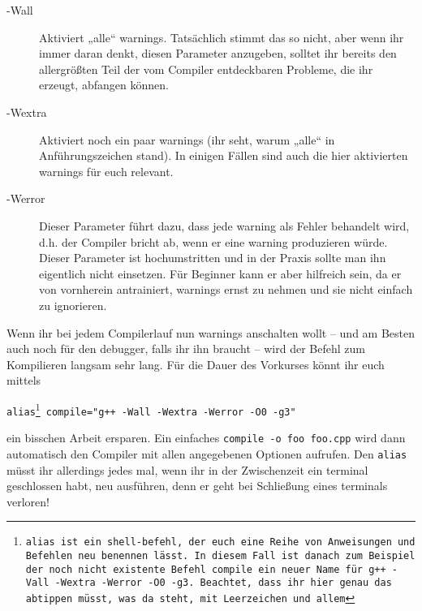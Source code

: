 \begin{description}
    \item[-Wall]
          Aktiviert „alle“ warnings. Tatsächlich stimmt das so nicht, aber wenn
          ihr immer daran denkt, diesen Parameter anzugeben, solltet ihr bereits
          den allergrößten Teil der vom Compiler entdeckbaren Probleme, die ihr
          erzeugt, abfangen können.
    \item[-Wextra]
          Aktiviert noch ein paar warnings (ihr seht, warum „alle“ in
          Anführungszeichen stand). In einigen Fällen sind auch die hier
          aktivierten warnings für euch relevant.
    \item[-Werror]
          Dieser Parameter führt dazu, dass jede warning als Fehler behandelt
          wird, d.h. der Compiler bricht ab, wenn er eine warning produzieren
          würde. Dieser Parameter ist hochumstritten und in der Praxis sollte man
          ihn eigentlich nicht einsetzen. Für Beginner kann er aber hilfreich
          sein, da er von vornherein antrainiert, warnings ernst zu nehmen und
          sie nicht einfach zu ignorieren.
\end{description}

Wenn ihr bei jedem Compilerlauf nun warnings anschalten wollt -- und am Besten
auch noch für den debugger, falls ihr ihn braucht -- wird der Befehl zum
Kompilieren langsam sehr lang. Für die Dauer des Vorkurses könnt ihr euch
mittels

\begin{center}
    \texttt{alias\footnote{alias ist ein shell-befehl, der euch eine Reihe von
            Anweisungen und Befehlen neu benennen lässt. In diesem Fall ist danach zum
            Beispiel der noch nicht existente Befehl \texttt{compile} ein neuer Name für
            \texttt{g++ -Vall -Wextra -Werror -O0 -g3}. Beachtet, dass ihr hier genau das
            abtippen müsst, was da steht, mit Leerzeichen und allem} compile="g++ -Wall
        -Wextra -Werror -O0 -g3"}
\end{center}

ein bisschen Arbeit ersparen. Ein einfaches \texttt{compile -o foo foo.cpp}
wird dann automatisch den Compiler mit allen angegebenen Optionen aufrufen. Den
\texttt{alias} müsst ihr allerdings jedes mal, wenn ihr in der Zwischenzeit ein
\Gls{terminal} geschlossen habt, neu ausführen, denn er geht bei Schließung eines
\Glspl{terminal} verloren!


